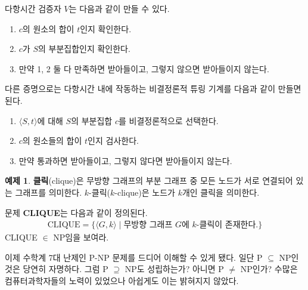 \documentclass[b5paper, 10pt]{book}
\theoremstyle{definition}
\newtheorem{ex}[defn]{예제}
\newenvironment{pf*}{\pushQED{\qed}\pf}{\popQED\endpf}
\begin{document}
\begin{pf*}
    다항시간 검증자 $V$는 다음과 같이 만들 수 있다.
    \begin{enumerate}
        \item $c$의 원소의 합이 $t$인지 확인한다.
        \item $c$가 $S$의 부분집합인지 확인한다.
        \item 만약 1, 2 둘 다 만족하면 받아들이고, 그렇지 않으면 받아들이지 않는다.
    \end{enumerate}
    다른 증명으로는 다항시간 내에 작동하는 비결정론적 튜링 기계를 다음과 같이 만들면 된다.
    \begin{enumerate}
        \item $\langle S, t \rangle$에 대해 $S$의 부분집합 $c$를 비결정론적으로 선택한다.
        \item $c$의 원소들의 합이 $t$인지 검사한다.
        \item 만약 통과하면 받아들이고, 그렇지 않다면 받아들이지 않는다. 
    \end{enumerate}
\end{pf*}
\begin{ex}
    \textbf{클릭}(clique)은 무방향 그래프의 부분 그래프 중 모든 노드가 서로 연결되어 있는 그래프를 의미한다.
    $k$-클릭($k$-clique)은 노드가 $k$개인 클릭을 의미한다.
\begin{figure}[!ht]
    \centering
    \caption{}
\end{figure}
문제 \textbf{CLIQUE}는 다음과 같이 정의된다.
\begin{align*}
    \text{CLIQUE} = \{ \langle G , k \rangle \;\vert\; \text{무방향 그래프 } 
    G\text{에 }k\text{-클릭이 존재한다.}\}
\end{align*}
CLIQUE $\in$ NP임을 보여라.
\end{ex}
이제 수학계 7대 난제인 P-NP 문제를 드디어 이해할 수 있게 됐다. 
일단 P $\subseteq$ NP인 것은 당연히 자명하다. 그럼 P $\supseteq$ NP도 성립하는가? 아니면
P $\neq$ NP인가? 수많은 컴퓨터과학자들의 노력이 있었으나 아쉽게도 이는 밝혀지지 않았다. 
\end{document}
